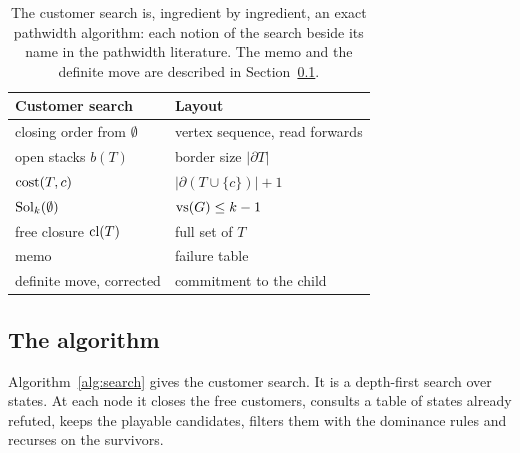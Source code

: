 \begin{table}[t]
\centering\small
\caption{The customer search is, ingredient by ingredient, an exact pathwidth
algorithm: each notion of the search beside its name in the pathwidth
literature. The memo and the definite move are described in
Section~\ref{sec:algorithm}.}
\label{tab:dictionary}
\begin{tabularx}{\linewidth}{@{}>{\raggedright}p{5.2cm}>{\raggedright\arraybackslash}X@{}}
\toprule
Customer search & Layout \\
\midrule
closing order from $\emptyset$ & vertex sequence, read forwards \\
open stacks $b(T)$ & border size $|\partial T|$ \\
$\mathrm{cost}(T,c)$ & $|\partial(T\cup\{c\})|+1$ \\
$\mathrm{Sol}_k(\emptyset)$ & $\mathrm{vs}(G)\le k-1$ \\
free closure $\mathrm{cl}(T)$ & full set of $T$ \citep[p.~328]{SuchanVillanger2009} \\
memo & failure table \\
definite move, corrected & commitment to the child \\
\bottomrule\end{tabularx}
\end{table}

\subsection{The algorithm}
\label{sec:algorithm}

Algorithm~\ref{alg:search} gives the customer search. It is a depth-first
search over states. At each node it closes the free customers, consults a
table of states already refuted, keeps the playable candidates, filters them
with the dominance rules and recurses on the survivors.

